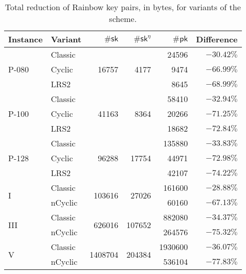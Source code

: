 \documentclass[12pt, a4paper, oneside]{memoir}
\theoremstyle{definition}
\begin{document}
\begin{table}[htbp]
  \renewcommand{\arraystretch}{1.2}
  \centering
  \caption{Total reduction of Rainbow key pairs, in bytes, for variants of the scheme.}\label{tab:pair-diff}
  \begin{tabular}{*{2}{l}*{4}{r}}
    \toprule
    Instance & Variant & $\#\mathsf{sk}$ & $\#\mathsf{sk}^{\eta}$ & $\#\mathsf{pk}$ & Difference \\ \midrule
    \multirow{3}{*}{P-080} & Classic & \multirow{3}{*}{\num{  16757}} & \multirow{3}{*}{\num{   4177}} & \num{   24596} & $-30.42\%$ \\
                           & Cyclic  &                                &                                & \num{    9474} & $-66.99\%$ \\
                           & LRS2    &                                &                                & \num{    8645} & $-68.99\%$ \\
    \multirow{3}{*}{P-100} & Classic & \multirow{3}{*}{\num{  41163}} & \multirow{3}{*}{\num{   8364}} & \num{   58410} & $-32.94\%$ \\
                           & Cyclic  &                                &                                & \num{   20266} & $-71.25\%$ \\
                           & LRS2    &                                &                                & \num{   18682} & $-72.84\%$ \\
    \multirow{3}{*}{P-128} & Classic & \multirow{3}{*}{\num{  96288}} & \multirow{3}{*}{\num{  17754}} & \num{  135880} & $-33.83\%$ \\
                           & Cyclic  &                                &                                & \num{   44971} & $-72.98\%$ \\
                           & LRS2    &                                &                                & \num{   42107} & $-74.22\%$ \\
    \multirow{2}{*}{I    } & Classic & \multirow{2}{*}{\num{ 103616}} & \multirow{2}{*}{\num{  27026}} & \num{  161600} & $-28.88\%$ \\
                           & nCyclic &                                &                                & \num{   60160} & $-67.13\%$ \\
    \multirow{2}{*}{III  } & Classic & \multirow{2}{*}{\num{ 626016}} & \multirow{2}{*}{\num{ 107652}} & \num{  882080} & $-34.37\%$ \\
                           & nCyclic &                                &                                & \num{  264576} & $-75.32\%$ \\
    \multirow{2}{*}{V    } & Classic & \multirow{2}{*}{\num{1408704}} & \multirow{2}{*}{\num{ 204384}} & \num{ 1930600} & $-36.07\%$ \\
                           & nCyclic &                                &                                & \num{  536104} & $-77.83\%$ \\
    \bottomrule
  \end{tabular}
\end{table}
\end{document}
